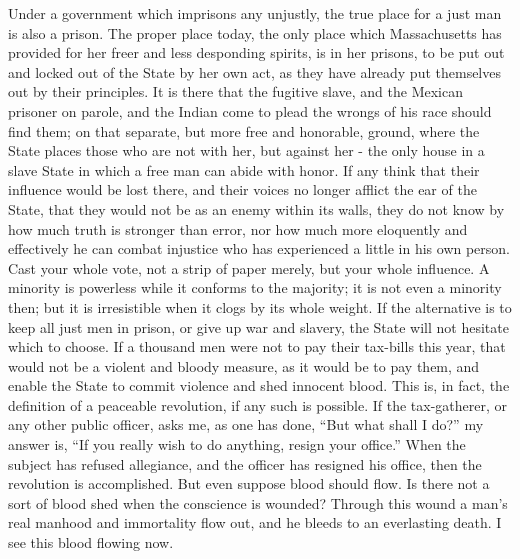 \documentclass[letterpaper,12pt,english]{sphinxmanual}
\begin{document}
Under a government which imprisons any unjustly, the true place for a just man is also a prison. The proper place today, the only place which Massachusetts has provided for her freer and less desponding spirits, is in her prisons, to be put out and locked out of the State by her own act, as they have already put themselves out by their principles. It is there that the fugitive slave, and the Mexican prisoner on parole, and the Indian come to plead the wrongs of his race should find them; on that separate, but more free and honorable, ground, where the State places those who are not with her, but against her - the only house in a slave State in which a free man can abide with honor. If any think that their influence would be lost there, and their voices no longer afflict the ear of the State, that they would not be as an enemy within its walls, they do not know by how much truth is stronger than error, nor how much more eloquently and effectively he can combat injustice who has experienced a little in his own person. Cast your whole vote, not a strip of paper merely, but your whole influence. A minority is powerless while it conforms to the majority; it is not even a minority then; but it is irresistible when it clogs by its whole weight. If the alternative is to keep all just men in prison, or give up war and slavery, the State will not hesitate which to choose. If a thousand men were not to pay their tax-bills this year, that would not be a violent and bloody measure, as it would be to pay them, and enable the State to commit violence and shed innocent blood. This is, in fact, the definition of a peaceable revolution, if any such is possible. If the tax-gatherer, or any other public officer, asks me, as one has done, ``But what shall I do?'' my answer is, ``If you really wish to do anything, resign your office.'' When the subject has refused allegiance, and the officer has resigned his office, then the revolution is accomplished. But even suppose blood should flow. Is there not a sort of blood shed when the conscience is wounded? Through this wound a man's real manhood and immortality flow out, and he bleeds to an everlasting death. I see this blood flowing now.
\end{document}
